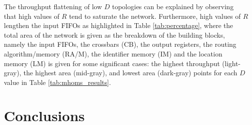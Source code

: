 \documentclass[10pt,twocolumn,journal]{IEEEtran}
\begin{document}
The throughput flattening of low $D$ topologies can be explained by observing that high 
values of $R$ 
tend to saturate the network. Furthermore, high values of $R$ lengthen the input FIFOs as highlighted in Table 
\ref{tab:percentage}, where the total area of the network is given as the breakdown of the building blocks, 
namely the input FIFOs, the crossbars (CB), the output registers, the routing algorithm/memory (RA/M), the identifier 
memory (IM) and the location memory (LM) is given for some significant cases: 
the highest throughput (light-gray),
the highest area (mid-gray), and lowest area (dark-gray) points for each $D$ value in Table \ref{tab:mhoms_results}. 



\section{Conclusions}
\label{sec:concl}
\end{document}
